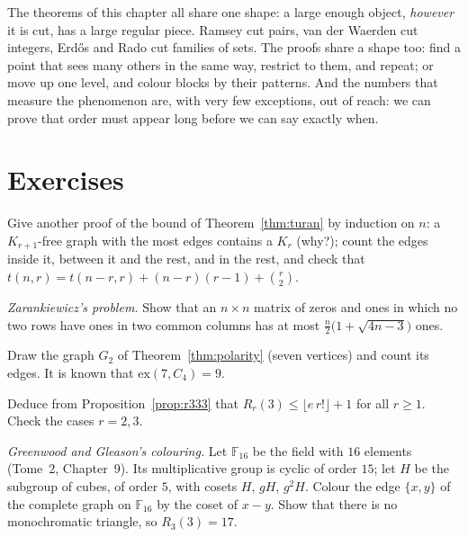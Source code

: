 \begin{beauty}
The theorems of this chapter all share one shape: a large enough object, \emph{however} it is cut, has a large regular piece. Ramsey cut pairs, van der Waerden cut
integers, Erd\H os and Rado cut families of sets. The proofs share a shape too: find a point that sees many others in the same way, restrict to them, and repeat;
or move up one level, and colour blocks by their patterns. And the numbers that measure the phenomenon are, with very few exceptions, out of reach: we can prove that
order must appear long before we can say exactly when.
\end{beauty}

\section{Exercises}

\begin{exercise}[$\star\star$]\label{ex:turaninduction}
Give another proof of the bound of Theorem~\ref{thm:turan} by induction on $n$: a $K_{r+1}$-free graph with the most edges contains a $K_r$ (why?); count the edges inside it,
between it and the rest, and in the rest, and check that $t(n,r)=t(n-r,r)+(n-r)(r-1)+\binom r2$.
\end{exercise}

\begin{exercise}[$\star\star$]\label{ex:zarankiewicz}
\emph{Zarankiewicz's problem.} Show that an $n\times n$ matrix of zeros and ones in which no two rows have ones in two common columns has at most $\frac n2\bigl(1+\sqrt{4n-3}\bigr)$
ones.
\end{exercise}

\begin{exercise}[$\star$]\label{ex:polarity}
Draw the graph $G_2$ of Theorem~\ref{thm:polarity} (seven vertices) and count its edges. It is known that $\mathrm{ex}(7,C_4)=9$.
\end{exercise}

\begin{exercise}[$\star$]\label{ex:schurbound}
Deduce from Proposition~\ref{prop:r333} that $R_r(3)\le\lfloor e\,r!\rfloor+1$ for all $r\ge1$. Check the cases $r=2,3$.
\end{exercise}

\begin{exercise}[$\star\star\star$]\label{ex:r333lower}
\emph{Greenwood and Gleason's colouring.} Let $\mathbb F_{16}$ be the field with $16$ elements (Tome~2, Chapter~9). Its multiplicative group is cyclic of order $15$; let $H$ be the subgroup of
cubes, of order $5$, with cosets $H$, $gH$, $g^2H$. Colour the edge $\{x,y\}$ of the complete graph on $\mathbb F_{16}$ by the coset of $x-y$. Show that there is no monochromatic
triangle, so $R_3(3)=17$.
\end{exercise}

